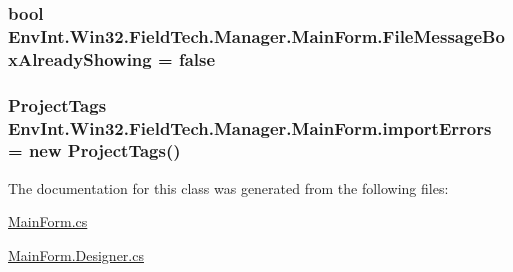 \subsubsection[{File\+Message\+Box\+Already\+Showing}]{\setlength{\rightskip}{0pt plus 5cm}bool Env\+Int.\+Win32.\+Field\+Tech.\+Manager.\+Main\+Form.\+File\+Message\+Box\+Already\+Showing = false\hspace{0.3cm}{\ttfamily [static]}}\label{class_env_int_1_1_win32_1_1_field_tech_1_1_manager_1_1_main_form_a7dbf57f63255d8251f75d8f6f9cfdffc}
\hypertarget{class_env_int_1_1_win32_1_1_field_tech_1_1_manager_1_1_main_form_a818352b5631b266edda57799ab3dad42}{}
\subsubsection[{import\+Errors}]{\setlength{\rightskip}{0pt plus 5cm}Project\+Tags Env\+Int.\+Win32.\+Field\+Tech.\+Manager.\+Main\+Form.\+import\+Errors = new Project\+Tags()\hspace{0.3cm}{\ttfamily [static]}}\label{class_env_int_1_1_win32_1_1_field_tech_1_1_manager_1_1_main_form_a818352b5631b266edda57799ab3dad42}


The documentation for this class was generated from the following files\+:\begin{DoxyCompactItemize}
\item 
\hyperlink{_main_form_8cs}{Main\+Form.\+cs}\item 
\hyperlink{_main_form_8_designer_8cs}{Main\+Form.\+Designer.\+cs}\end{DoxyCompactItemize}
